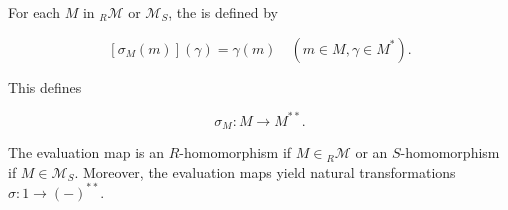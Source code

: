 For each $M$ in ${}_R\mathcal{M}$ or $\mathcal{M}_S$, the  is defined by

$$[\sigma_M(m)](\gamma) = \gamma(m) \quad (m \in M, \gamma \in M^*).$$

This defines

$$\sigma_M: M \to M^{**}.$$

The evaluation map is an $R$-homomorphism if $M \in {}_R\mathcal{M}$ or an $S$-homomorphism if $M \in \mathcal{M}_S$. Moreover, the evaluation maps yield natural transformations $\sigma: 1 \to (-)^{**}$.

